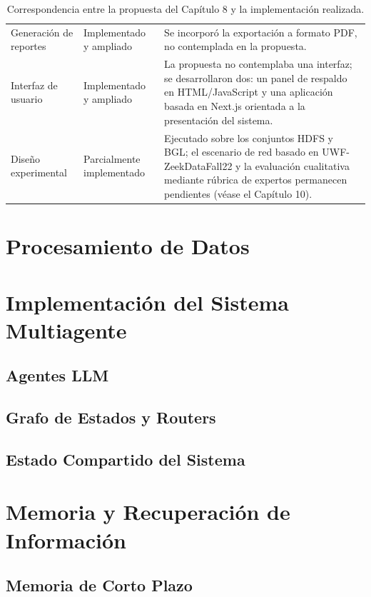 \begin{table}[H]
\begin{tabular}{p{3.3cm}p{3cm}p{7cm}}
Generación de reportes & Implementado y ampliado & Se incorporó la exportación a formato PDF, no contemplada en la propuesta. \\
Interfaz de usuario & Implementado y ampliado & La propuesta no contemplaba una interfaz; se desarrollaron dos: un panel de respaldo en HTML/JavaScript y una aplicación basada en Next.js orientada a la presentación del sistema. \\
Diseño experimental & Parcialmente implementado & Ejecutado sobre los conjuntos HDFS y BGL; el escenario de red basado en UWF-ZeekDataFall22 y la evaluación cualitativa mediante rúbrica de expertos permanecen pendientes (véase el Capítulo 10). \\
\bottomrule
\end{tabular}
\caption{Correspondencia entre la propuesta del Capítulo 8 y la implementación realizada.}
\label{tab:9.1-cap8-vs-cap9}
\end{table}

\section{Procesamiento de Datos}

\section{Implementación del Sistema Multiagente}

\subsection{Agentes LLM}

\subsection{Grafo de Estados y Routers}

\subsection{Estado Compartido del Sistema}

\section{Memoria y Recuperación de Información}

\subsection{Memoria de Corto Plazo}

